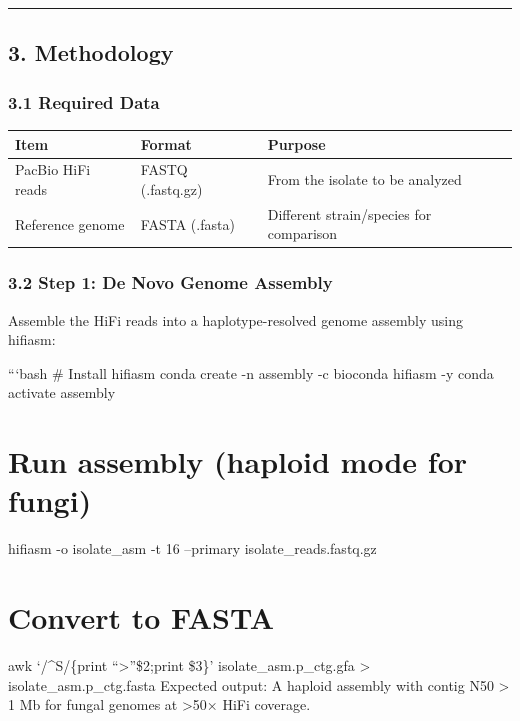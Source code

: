 \documentclass[
]{article}
\begin{document}
\begin{center}\rule{0.5\linewidth}{0.5pt}\end{center}

\hypertarget{methodology}{%
\subsection{3. Methodology}\label{methodology}}

\hypertarget{required-data}{%
\subsubsection{3.1 Required Data}\label{required-data}}

\begin{longtable}[]{@{}lll@{}}
\toprule
Item & Format & Purpose\tabularnewline
\midrule
\endhead
PacBio HiFi reads & FASTQ (.fastq.gz) & From the isolate to be
analyzed\tabularnewline
Reference genome & FASTA (.fasta) & Different strain/species for
comparison\tabularnewline
\bottomrule
\end{longtable}

\hypertarget{step-1-de-novo-genome-assembly}{%
\subsubsection{3.2 Step 1: De Novo Genome
Assembly}\label{step-1-de-novo-genome-assembly}}

Assemble the HiFi reads into a haplotype-resolved genome assembly using
hifiasm:

```bash \# Install hifiasm conda create -n assembly -c bioconda hifiasm
-y conda activate assembly

\hypertarget{run-assembly-haploid-mode-for-fungi}{%
\section{Run assembly (haploid mode for
fungi)}\label{run-assembly-haploid-mode-for-fungi}}

hifiasm -o isolate\_asm -t 16 --primary isolate\_reads.fastq.gz

\hypertarget{convert-to-fasta}{%
\section{Convert to FASTA}\label{convert-to-fasta}}

awk `/\^{}S/\{print ``\textgreater{}''\$2;print \$3\}'
isolate\_asm.p\_ctg.gfa \textgreater{} isolate\_asm.p\_ctg.fasta
Expected output: A haploid assembly with contig N50 \textgreater{} 1 Mb
for fungal genomes at \textgreater50× HiFi coverage.
\end{document}
